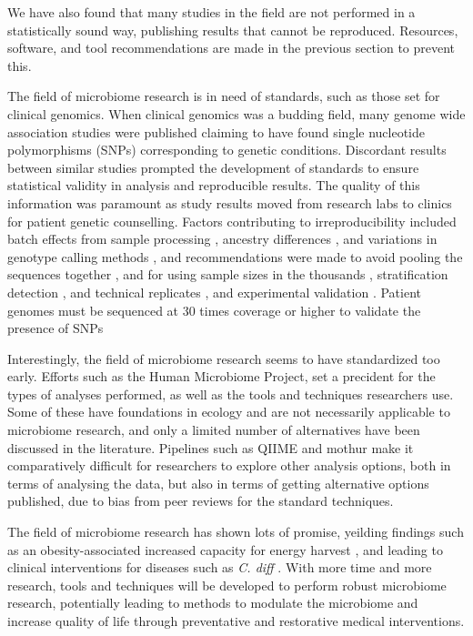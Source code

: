We have also found that many studies in the field are not performed in a statistically sound way, publishing results that cannot be reproduced. Resources, software, and tool recommendations are made in the previous section to prevent this.

The field of microbiome research is in need of standards, such as those set for clinical genomics. When clinical genomics was a budding field, many genome wide association studies were published claiming to have found single nucleotide polymorphisms (SNPs) corresponding to genetic conditions. Discordant results between similar studies prompted the development of standards to ensure statistical validity in analysis and reproducible results. The quality of this information was paramount as study results moved from research labs to clinics for patient genetic counselling. Factors contributing to irreproducibility included batch effects from sample processing \cite{leek2010tackling}, ancestry differences \cite{price2006principal}, and variations in genotype calling methods \cite{miclaus2010variability}, and recommendations were made to avoid pooling the sequences together \cite{mccarthy2008genome}, and for using sample sizes in the thousands \cite{burton2007genome}, stratification detection \cite{price2006principal}, and technical replicates \cite{hong2012technical}, and experimental validation \cite{mccarthy2008genome}. Patient genomes must be sequenced at 30 times coverage or higher to validate the presence of SNPs \cite{rehm2013acmg}

Interestingly, the field of microbiome research seems to have standardized too early. Efforts such as the Human Microbiome Project, set a precident for the types of analyses performed, as well as the tools and techniques researchers use. Some of these have foundations in ecology and are not necessarily applicable to microbiome research, and only a limited number of alternatives have been discussed in the literature. Pipelines such as QIIME \cite{caporaso2010qiime} and mothur \cite{schloss2009introducing} make it comparatively difficult for researchers to explore other analysis options, both in terms of analysing the data, but also in terms of getting alternative options published, due to bias from peer reviews for the standard techniques.

The field of microbiome research has shown lots of promise, yeilding findings such as an obesity-associated increased capacity for energy harvest \cite{turnbaugh2006obesity}, and leading to clinical interventions for diseases such as \textit{C. diff} \cite{petrof2013stool}. With more time and more research, tools and techniques will be developed to perform robust microbiome research, potentially leading to methods to modulate the microbiome and increase quality of life through preventative and restorative medical interventions.
